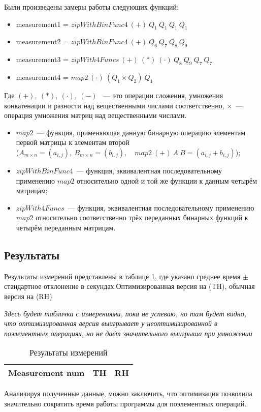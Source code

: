 Были произведены замеры работы следующих функций:
\begin{itemize}
    \item measurement1 = $zipWithBinFunc4\ (+) \ Q_1 \ Q_1 \ Q_1\ Q_1$
    \item measurement2 = $zipWithBinFunc4\ (+) \ Q_6 \ Q_7 \ Q_8\ Q_9$
    \item measurement3 = $zipWith4Funcs\ (+) \ (*)\ (\cdot) \ Q_8 \ Q_9 \ Q_7\ Q_7$
    \item measurement4 = $map2\ (\cdot)\ (Q_1 \times Q_2)\ Q_1 $
\end{itemize}
Где $(+),\ (*), \ (\cdot), \ (-) $ ~--- это операции сложения, умножения конкатенации и разности над вещественными числами соответственно, $\times$~--- операция умножения матриц над вещественными числами.
\begin{itemize}
    \item $map2$~--- функция, применяющая данную бинарную операцию элементам первой матрицы к элементам второй\\($A_{m\times n} = (a_{i, j}), \ B_{m\times n} = (b_{i, j}), \quad map2 \ (+)\ A \ B = (a_{i, j} + b_{i, j})$);
    \item $zipWithBinFunc4$~--- функция, эквивалентная последовательному применению $map2$ относительно одной и той же функции к данным четырём матрицам;
    \item $zipWith4Funcs$~--- функция, эквивалентная последовательному применению $map2$ относительно соответственно трёх переданных бинарных функций к четырём переданным матрицам.
\end{itemize}
\subsection{Результаты}
Результаты измерений представлены в таблице \ref{results}, где указано среднее время $\pm$ стандартное отклонение в секундах.Оптимизированная версия на \Th{} (TH), обычная версия на \Haskell{} (RH)

\textit{Здесь будет табличка с измерениями, пока не успеваю, но там будет видно, что оптимизированная версия выигрывает у неоптимизированной в поэлементных операциях, но не даёт значительного выигрыша при умножении}
\begin{table}[h!]
    \def\arraystretch{1.1}  %
    \setlength\tabcolsep{0.2em}
    \centering
    \caption{Результаты измерений}
    \begin{tabular}[C]{l|r|r}
        \toprule
        Measurement num& TH& RH \\ \midrule
        \bottomrule
    \end{tabular}
    \label{results}
\end{table}


Анализируя полученные данные, можно заключить, что оптимизация позволила значительно сократить время работы программы для поэлементных операций.
